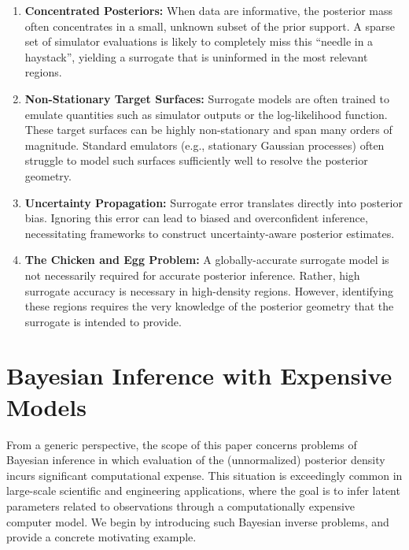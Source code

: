 \documentclass[12pt]{article}
\begin{document}
\begin{enumerate}
    \item \textbf{Concentrated Posteriors:} When data are informative, the posterior mass often concentrates in a small, 
    unknown subset of the prior support. A sparse set of simulator evaluations is likely to completely miss this 
    ``needle in a haystack'', yielding a surrogate that is uninformed in the most relevant regions. 
    \item \textbf{Non-Stationary Target Surfaces:} Surrogate models are often trained to emulate quantities such as 
    simulator outputs or the log-likelihood function. These target surfaces can be highly non-stationary and span many 
    orders of magnitude. Standard emulators (e.g., stationary Gaussian processes) often struggle to model such surfaces 
    sufficiently well to resolve the posterior geometry.
    \item \textbf{Uncertainty Propagation:} Surrogate error translates directly into posterior bias. Ignoring this error can lead to
    biased and overconfident inference, necessitating frameworks to construct uncertainty-aware posterior estimates.
    \item \textbf{The Chicken and Egg Problem:} A globally-accurate surrogate model is not necessarily required for accurate
    posterior inference. Rather, high surrogate accuracy is necessary in high-density regions. However, identifying these 
    regions requires the very knowledge of the posterior geometry that the surrogate is intended to provide.
\end{enumerate}


\section{Bayesian Inference with Expensive Models} \label{sec:background}
From a generic perspective, the scope of this paper concerns problems of Bayesian inference in which evaluation
of the (unnormalized) posterior density incurs significant computational expense. This situation is exceedingly common 
in large-scale scientific and engineering applications, where the goal is to infer latent parameters related to 
observations through a computationally expensive computer model. We begin by introducing such Bayesian inverse 
problems, and provide a concrete motivating example. 
 
\end{document}
